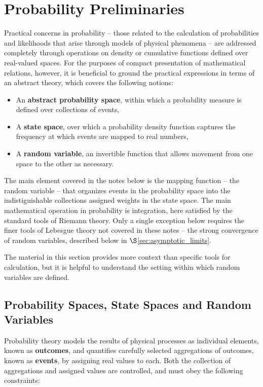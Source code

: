 \documentclass[12pt, twoside, draft]{article}
\begin{document}
\section{Probability Preliminaries}\label{sec:probability_preliminaries}

Practical concerns in probability -- those related to the calculation of probabilities and likelihoods that arise through models of physical phenomena --  are addressed completely through operations on density or cumulative functions defined over real-valued spaces.  For the purposes of compact presentation of mathematical relations, however, it is beneficial to ground the practical expressions in terms of an abstract theory, which covers the following notions:

\begin{itemize}[noitemsep]
\item An \textbf{abstract probability space}, within which a probability measure is defined over collections of events, 
\item A \textbf{state space}, over which a probability density function captures the frequency at which events are mapped to real numbers, 
\item A \textbf{random variable}, an invertible function that allows movement from one space to the other as necessary.  
\end{itemize}

The main element covered in the notes below is the mapping function -- the random variable -- that organizes events in the probability space into the indistiguishable collections assigned weights in the state space.  The main mathematical operation in probability is integration, here satisfied by the standard tools of Riemann theory.  Only a single exception below requires the finer tools of Lebesgue theory not covered in these notes -- the strong convergence of random variables, described below in $\S$\ref{sec:asymptotic_limits}.

The material in this section provides more context than specific tools for calculation, but it is helpful to understand the setting within which random variables are defined.

\subsection{Probability Spaces, State Spaces and Random Variables}\label{sec:random_variables}

Probability theory models the results of physical processes as individual elements, known as \textbf{outcomes}, and quantifies carefully selected aggregations of outcomes, known as \textbf{events}, by assigning real values to each.  Both the collection of aggregations and assigned values are controlled, and must obey the following constraints:
\end{document}
